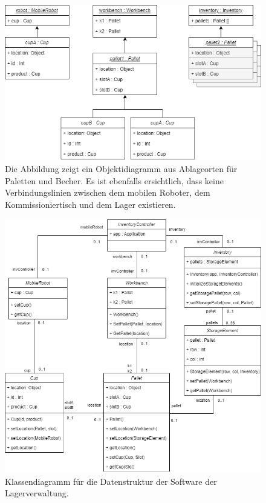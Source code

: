 \begin{figure}
        \caption[Objektdiagramm]
        {\small Die Abbildung zeigt ein Objektidiagramm aus Ablageorten für Paletten und Becher. Es ist ebenfalls
        ersichtlich, dass keine Verbindungslinien zwischen dem mobilen Roboter, dem Kommissioniertisch und dem Lager existieren.
        }\label{fig:figure14}
        \includegraphics[width = \textwidth ]{Bilder/Objektdiagramm_PaletteCupStorage}
        \centering
\end{figure}

\begin{figure}
        \caption[Klassendiagramm Datenmodell ]
        {\small Klassendiagramm für die Datenstruktur der Software der Lagerverwaltung.
        }\label{fig:figure15}
        \includegraphics[width = \textwidth ]{Bilder/Klassendiagramm_Datenstruktur}
        \centering
\end{figure}


